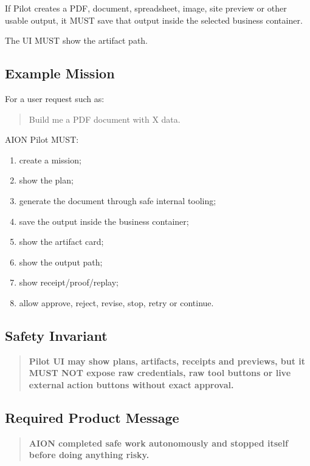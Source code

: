 If Pilot creates a PDF, document, spreadsheet, image, site preview or other usable output, it MUST save that output inside the selected business container.

The UI MUST show the artifact path.

\subsection{Example Mission}

For a user request such as:

\begin{quote}
Build me a PDF document with X data.
\end{quote}

AION Pilot MUST:

\begin{enumerate}
  \item create a mission;
  \item show the plan;
  \item generate the document through safe internal tooling;
  \item save the output inside the business container;
  \item show the artifact card;
  \item show the output path;
  \item show receipt/proof/replay;
  \item allow approve, reject, revise, stop, retry or continue.
\end{enumerate}

\subsection{Safety Invariant}

\begin{quote}
\textbf{Pilot UI may show plans, artifacts, receipts and previews, but it MUST NOT expose raw credentials, raw tool buttons or live external action buttons without exact approval.}
\end{quote}

\subsection{Required Product Message}

\begin{quote}
\textbf{AION completed safe work autonomously and stopped itself before doing anything risky.}
\end{quote}

